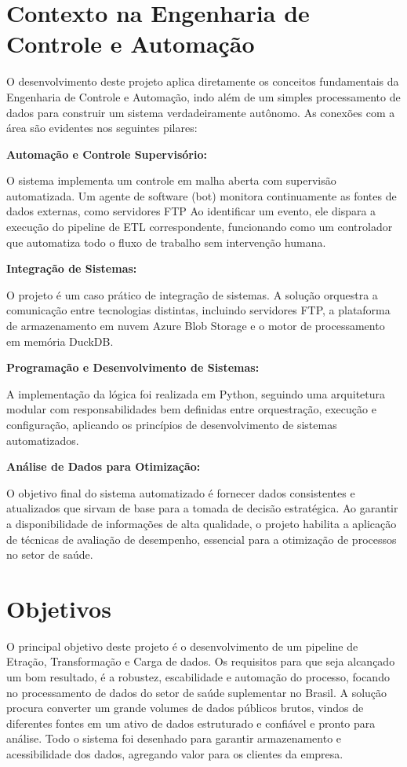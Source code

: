 \newpage
\section{Contexto na Engenharia de Controle e Automação}

O desenvolvimento deste projeto aplica diretamente os conceitos fundamentais da Engenharia de Controle e Automação, indo além de um simples processamento de dados para construir um sistema verdadeiramente autônomo. As conexões com a área são evidentes nos seguintes pilares:

\textbf{Automação e Controle Supervisório:} 

O sistema implementa um controle em malha aberta com supervisão automatizada. Um agente de software (bot) monitora continuamente as fontes de dados externas, como servidores FTP Ao identificar um evento, ele dispara a execução do pipeline de ETL correspondente, funcionando como um controlador que automatiza todo o fluxo de trabalho sem intervenção humana.

\textbf{Integração de Sistemas:}

O projeto é um caso prático de integração de sistemas. A solução orquestra a comunicação entre tecnologias distintas, incluindo servidores FTP, a plataforma de armazenamento em nuvem Azure Blob Storage e o motor de processamento em memória DuckDB.

\textbf{Programação e Desenvolvimento de Sistemas:}

A implementação da lógica foi realizada em Python, seguindo uma arquitetura modular com responsabilidades bem definidas entre orquestração, execução e configuração, aplicando os princípios de desenvolvimento de sistemas automatizados.

\textbf{Análise de Dados para Otimização:}

O objetivo final do sistema automatizado é fornecer dados consistentes e atualizados que sirvam de base para a tomada de decisão estratégica. Ao garantir a disponibilidade de informações de alta qualidade, o projeto habilita a aplicação de técnicas de avaliação de desempenho, essencial para a otimização de processos no setor de saúde.

\section{Objetivos}

O principal objetivo deste projeto é o desenvolvimento de um pipeline de Etração, Transformação e Carga de dados. Os requisitos para que seja alcançado um bom resultado, é a robustez, escabilidade e automação do processo, focando no processamento de dados do setor de saúde suplementar no Brasil. A solução procura converter um grande volumes de dados públicos brutos, vindos de diferentes fontes em um ativo de dados estruturado e confiável e pronto para análise. Todo o sistema foi desenhado para garantir armazenamento e acessibilidade dos dados, agregando valor para os clientes da empresa.

